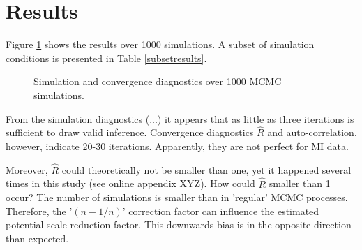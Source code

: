 \documentclass[article]{jss}
\begin{document}

\section{Results}

Figure \ref{resultssim} shows the results over 1000 simulations. A subset of simulation conditions is presented in Table \ref{subsetresults}. 

\begin{figure}[h]
  \caption{Simulation and convergence diagnostics over 1000 MCMC simulations.}
    \label{resultssim}
\end{figure}

From the simulation diagnostics (...) it appears that as little as three iterations is sufficient to draw valid inference. Convergence diagnostics $\widehat{R}$ and auto-correlation, however, indicate 20-30 iterations. Apparently, they are not perfect for MI data. 

Moreover, $\widehat{R}$ could  theoretically not be smaller than one, yet it happened several times in this study (see online appendix XYZ). How could $\widehat{R}$ smaller than 1 occur? The number of simulations is smaller than in 'regular' MCMC processes. Therefore, the '$(n-1/n)$' correction factor can influence the estimated potential scale reduction factor. This downwards bias is in the opposite direction than expected. 
\end{document}
